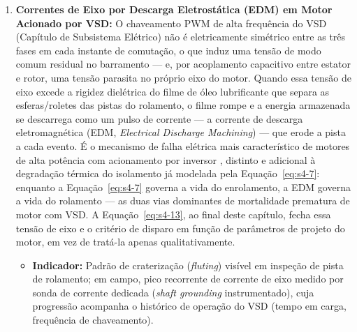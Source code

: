 \documentclass[12pt,a4paper]{article}
\numberwithin{equation}{section}
\numberwithin{table}{section}
\numberwithin{figure}{section}
\begin{document}
\begin{enumerate}
		\begin{equation}\label{eq:s4-8}
		\begin{aligned}
			VU &= 100 \cdot \frac{\max_i |V_{L,i} - \bar{V}_L|}{\bar{V}_L} \\[6pt]
			IU &= 100 \cdot \frac{\max_i |I_i - \bar{I}|}{\bar{I}} \\[6pt]
			\Delta T_{\text{fases}} &= \max(T_1, T_2, T_3) - \min(T_1, T_2, T_3)
		\end{aligned}
		\end{equation}
		Onde $\bar{V}_L$ e $\bar{I}$ são as médias das três tensões de linha e das três correntes de fase, respectivamente. Um $IU$ persistente acima de poucos pontos percentuais mesmo com $VU$ pequeno — sintoma que a corrente de linha agregada sozinha não capta — já justifica investigação de curto entre espiras ou conexão frouxa no painel.
		\item \textbf{Correntes de Eixo por Descarga Eletrostática (EDM) em Motor Acionado por VSD:} O chaveamento PWM de alta frequência do VSD (Capítulo de Subsistema Elétrico) não é eletricamente simétrico entre as três fases em cada instante de comutação, o que induz uma tensão de modo comum residual no barramento — e, por acoplamento capacitivo entre estator e rotor, uma tensão parasita no próprio eixo do motor. Quando essa tensão de eixo excede a rigidez dielétrica do filme de óleo lubrificante que separa as esferas/roletes das pistas do rolamento, o filme rompe e a energia armazenada se descarrega como um pulso de corrente — a corrente de descarga eletromagnética (EDM, \textit{Electrical Discharge Machining}) — que erode a pista a cada evento. É o mecanismo de falha elétrica mais característico de motores de alta potência com acionamento por inversor \cite{erdman}, distinto e adicional à degradação térmica do isolamento já modelada pela Equação~\eqref{eq:s4-7}: enquanto a Equação~\eqref{eq:s4-7} governa a vida do enrolamento, a EDM governa a vida do rolamento — as duas vias dominantes de mortalidade prematura de motor com VSD. A Equação~\eqref{eq:s4-13}, ao final deste capítulo, fecha essa tensão de eixo e o critério de disparo em função de parâmetros de projeto do motor, em vez de tratá-la apenas qualitativamente.
		\begin{itemize}
			\item \textbf{Indicador:} Padrão de craterização (\textit{fluting}) visível em inspeção de pista de rolamento; em campo, pico recorrente de corrente de eixo medido por sonda de corrente dedicada (\textit{shaft grounding} instrumentado), cuja progressão acompanha o histórico de operação do VSD (tempo em carga, frequência de chaveamento).

\end{itemize}
\end{enumerate}
\end{document}
